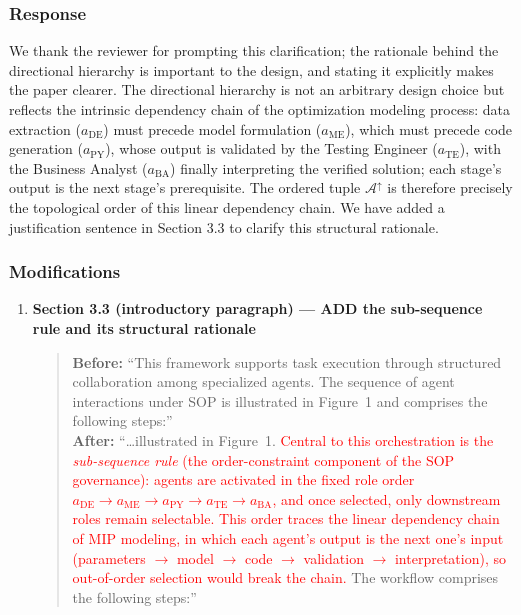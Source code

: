 \documentclass[11pt,a4paper]{article}
\begin{document}
\subsubsection{Response}
We thank the reviewer for prompting this clarification; the rationale behind the directional hierarchy is important to the design, and stating it explicitly makes the paper clearer. The directional hierarchy is not an arbitrary design choice but reflects the intrinsic dependency chain of the optimization modeling process: data extraction ($a_{\text{DE}}$) must precede model formulation ($a_{\text{ME}}$), which must precede code generation ($a_{\text{PY}}$), whose output is validated by the Testing Engineer ($a_{\text{TE}}$), with the Business Analyst ($a_{\text{BA}}$) finally interpreting the verified solution; each stage's output is the next stage's prerequisite. The ordered tuple $\mathcal{A}^{\uparrow}$ is therefore precisely the topological order of this linear dependency chain. We have added a justification sentence in Section 3.3 to clarify this structural rationale.

\subsubsection{Modifications}
\begin{enumerate}
\item \textbf{Section 3.3 (introductory paragraph) --- ADD the sub-sequence rule and its structural rationale}
\begin{quote}
\textbf{Before:} ``This framework supports task execution through structured collaboration among specialized agents. The sequence of agent interactions under SOP is illustrated in Figure~1 and comprises the following steps:''\\[4pt]
\textbf{After:} ``\ldots illustrated in Figure~1. \textcolor{red}{Central to this orchestration is the \emph{sub-sequence rule} (the order-constraint component of the SOP governance): agents are activated in the fixed role order $a_{\text{DE}} \rightarrow a_{\text{ME}} \rightarrow a_{\text{PY}} \rightarrow a_{\text{TE}} \rightarrow a_{\text{BA}}$, and once selected, only downstream roles remain selectable. This order traces the linear dependency chain of MIP modeling, in which each agent's output is the next one's input (parameters $\rightarrow$ model $\rightarrow$ code $\rightarrow$ validation $\rightarrow$ interpretation), so out-of-order selection would break the chain.} The workflow comprises the following steps:'' 
\end{quote}
\end{enumerate}
\end{document}
